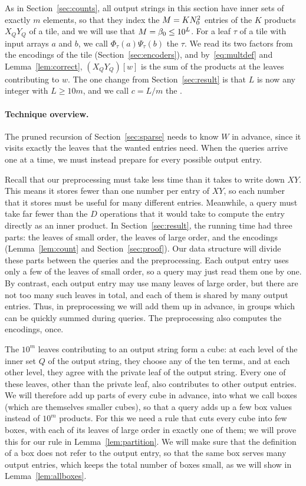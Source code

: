 As in Section~\ref{sec:counts}, all output strings in this section have inner sets of exactly $m$ elements, so that they index the $M=KN_0^2$ entries of the $K$ products $X_QY_Q$ of a tile, and we will use that $M=\beta_0\le10^L$. For a leaf $\tau$ of a tile with input arrays $a$ and $b$, we call $\Phi_\tau(a)\Psi_\tau(b)$ the  $\tau$. We read its two factors from the encodings of the tile (Section~\ref{sec:encoders}), and by~\eqref{eq:multdef} and Lemma~\ref{lem:correct}, $(X_QY_Q)[w]$ is the sum of the products at the leaves contributing to $w$. The one change from Section~\ref{sec:result} is that $L$ is now any integer with $L\ge10m$, and we call $c=L/m$ the .

\paragraph{Technique overview.}
The pruned recursion of Section~\ref{sec:sparse} needs to know $W$ in advance, since it visits exactly the leaves that the wanted entries need. When the queries arrive one at a time, we must instead prepare for every possible output entry.

Recall that our preprocessing must take less time than it takes to write down $XY$. This means it stores fewer than one number per entry of $XY$, so each number that it stores must be useful for many different entries. Meanwhile, a query must take far fewer than the $D$ operations that it would take to compute the entry directly as an inner product. In Section~\ref{sec:result}, the running time had three parts: the leaves of small order, the leaves of large order, and the encodings (Lemma~\ref{lem:count} and Section~\ref{sec:proof}). Our data structure will divide these parts between the queries and the preprocessing. Each output entry uses only a few of the leaves of small order, so a query may just read them one by one. By contrast, each output entry may use many leaves of large order, but there are not too many such leaves in total, and each of them is shared by many output entries. Thus, in preprocessing we will add them up in advance, in groups which can be quickly summed during queries. The preprocessing also computes the encodings, once.

The $10^m$ leaves contributing to an output string form a cube: at each level of the inner set $Q$ of the output string, they choose any of the ten terms, and at each other level, they agree with the private leaf of the output string. Every one of these leaves, other than the private leaf, also contributes to other output entries. We will therefore add up parts of every cube in advance, into what we call boxes (which are themselves smaller cubes), so that a query adds up a few box values instead of $10^m$ products. For this we need a rule that cuts every cube into few boxes, with each of its leaves of large order in exactly one of them; we will prove this for our rule in Lemma~\ref{lem:partition}. We will make sure that the definition of a box does not refer to the output entry, so that the same box serves many output entries, which keeps the total number of boxes small, as we will show in Lemma~\ref{lem:allboxes}.

